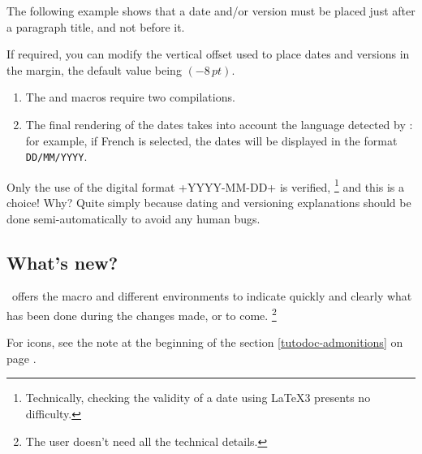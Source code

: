 \begin{tdocexa}
	The following example shows that a date and/or version must be placed just after a paragraph title, and not before it.

\end{tdocexa}


\begin{tdocexa}
	If required, you can modify the vertical offset used to place dates and versions in the margin, the default value being $(-8\,\mathit{pt})$.

\end{tdocexa}


\begin{tdocimp}
    \begin{enumerate}[wide]
        \item The  and  macros require two compilations.

        \item The final rendering of the dates takes into account the language detected by \thisproj{}: for example, if French is selected, the dates will be displayed in the format \texttt{DD/MM/YYYY}.
    \end{enumerate}
\end{tdocimp}


\begin{tdoccaut}
    Only the use of the digital format \tdoclatexin+YYYY-MM-DD+ is verified,%
    \footnote{
        Technically, checking the validity of a date using \LaTeX3 presents no difficulty.
    }
    and this is a choice! Why? Quite simply because dating and versioning explanations should be done semi-automatically to avoid any human bugs.
\end{tdoccaut}


\subsection{What's new?}

\thisproj\ offers the macro  and different environments to indicate quickly and clearly what has been done during the changes made, or to come.%
\footnote{
    The user doesn't need all the technical details.
}


\begin{tdocnote}
    For icons, see the note at the beginning of the section \ref{tutodoc-admonitions} on page \pageref{tutodoc-admonitions}.
\end{tdocnote}


